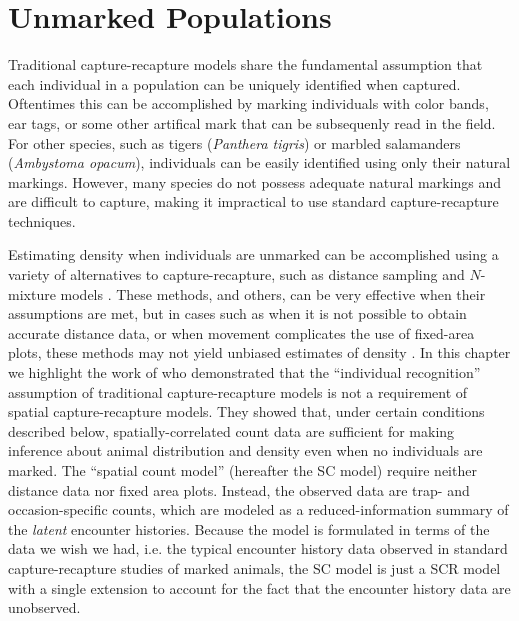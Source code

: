\chapter{Unmarked Populations}
\label{chapt.scr-unmarked}

\vspace{0.3cm}


Traditional capture-recapture models share the fundamental
assumption that each individual in a population can be uniquely
identified when captured. Oftentimes this can be accomplished
by marking individuals with color bands, ear tags, or some other
artifical mark that can be subsequenly read in the field. For other
species, such as tigers (\textit{Panthera tigris}) or
marbled salamanders (\textit{Ambystoma opacum}),
individuals can be easily identified
using only their natural markings. However, many species
do not possess adequate natural markings and are
difficult to capture, making it impractical to use standard
capture-recapture techniques.

Estimating density when individuals are unmarked can be accomplished
using a variety of alternatives to capture-recapture, such as distance
sampling \citep{buckland_etal:2001} and $N$-mixture models
\citep{royle:2004biom}. These methods, and others, can be
very effective when their assumptions are met, but in cases such as
when it is not possible to obtain accurate distance data, or when
movement complicates the use of fixed-area plots,
these methods may not yield unbiased estimates of density
\citep{chandler_etal:2011}. In this chapter we highlight the work of
\citet{chandler_royle:2012} who demonstrated that the ``individual
recognition'' assumption of traditional capture-recapture models is not a
requirement of spatial capture-recapture models. They showed that,
under certain conditions described below, spatially-correlated count
data are sufficient for making inference about animal distribution and
density even when no individuals are marked.
The \citet{chandler_royle:2012} ``spatial count model'' (hereafter the SC
model) require neither distance data nor fixed area plots. Instead,
the observed data are trap- and occasion-specific counts, which
are modeled as a reduced-information summary of the \textit{latent}
encounter histories. Because the model is formulated in terms of the
data we wish we had, i.e. the typical encounter history data observed
in standard capture-recapture studies of marked animals, the SC model
is just a SCR model with a single extension to account for the fact
that the encounter history data are unobserved.

